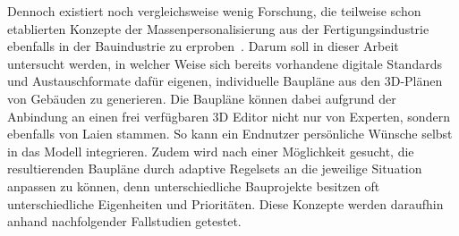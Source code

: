 Dennoch existiert noch vergleichsweise wenig Forschung, die teilweise schon etablierten Konzepte der Massenpersonalisierung aus der Fertigungsindustrie ebenfalls in der Bauindustrie zu erproben~\cite{Larsen2019}.
Darum soll in dieser Arbeit untersucht werden, in welcher Weise sich bereits vorhandene digitale Standards und Austauschformate dafür eigenen, individuelle Baupläne aus den 3D-Plänen von Gebäuden zu generieren.
Die Baupläne können dabei aufgrund der Anbindung an einen frei verfügbaren 3D Editor nicht nur von Experten, sondern ebenfalls von Laien stammen.
So kann ein Endnutzer persönliche Wünsche selbst in das Modell integrieren.
Zudem wird nach einer Möglichkeit gesucht, die resultierenden Baupläne durch adaptive Regelsets an die jeweilige Situation anpassen zu können, denn unterschiedliche Bauprojekte besitzen oft unterschiedliche Eigenheiten und Prioritäten.
Diese Konzepte werden daraufhin anhand nachfolgender Fallstudien getestet.
